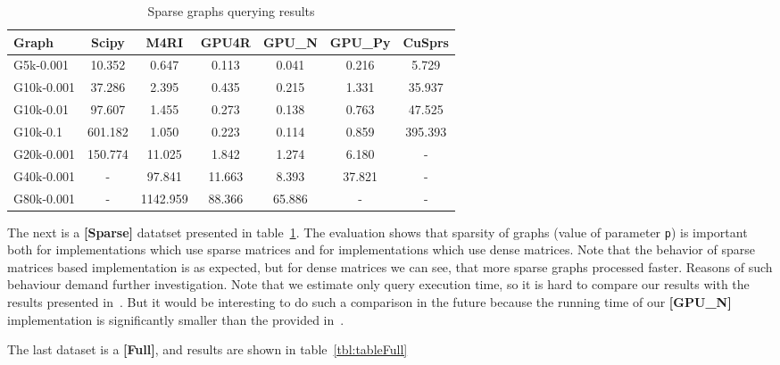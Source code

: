 {\setlength{\tabcolsep}{0.4em}
\begin{table}[H]
\caption{Sparse graphs querying results}
\label{tbl:tableSparse}
\begin{tabular}{| l | c | c | c | c | c | c | }
    \hline
    Graph              & Scipy   & M4RI     & GPU4R  & GPU\_N & GPU\_Py & CuSprs  \\
    \hline
    \hline
    \small{G5k-0.001}  & 10.352  & 0.647    & 0.113  & 0.041  & 0.216   & 5.729   \\
    \small{G10k-0.001} & 37.286  & 2.395    & 0.435  & 0.215  & 1.331   & 35.937  \\
    \small{G10k-0.01}  & 97.607  & 1.455    & 0.273  & 0.138  & 0.763   & 47.525  \\
    \small{G10k-0.1}   & 601.182 & 1.050    & 0.223  & 0.114  & 0.859   & 395.393 \\
    \small{G20k-0.001} & 150.774 & 11.025   & 1.842  & 1.274  & 6.180   & -       \\
    \small{G40k-0.001} & -       & 97.841   & 11.663 & 8.393  & 37.821  & -       \\
    \small{G80k-0.001} & -       & 1142.959 & 88.366 & 65.886 & -       & -       \\
    \hline
  \end{tabular}
\end{table}
}

The next is a \textbf{[Sparse]} datatset presented in table~\ref{tbl:tableSparse}.
The evaluation shows that sparsity of graphs (value of parameter \texttt{p}) is important both for implementations which use sparse matrices and for implementations which use dense matrices.
Note that the behavior of sparse matrices based implementation is as expected, but for dense matrices we can see, that more sparse graphs processed faster.
Reasons of such behaviour demand further investigation.
Note that we estimate only query execution time, so it is hard to compare our results with the results presented in~\cite{fan2018scaling}.
But it would be interesting to do such a comparison in the future because the running time of our \textbf{[GPU\_N]} implementation is significantly smaller than the provided in~\cite{fan2018scaling}.

The last dataset is a \textbf{[Full]}, and results are shown in table~\ref{tbl:tableFull}



